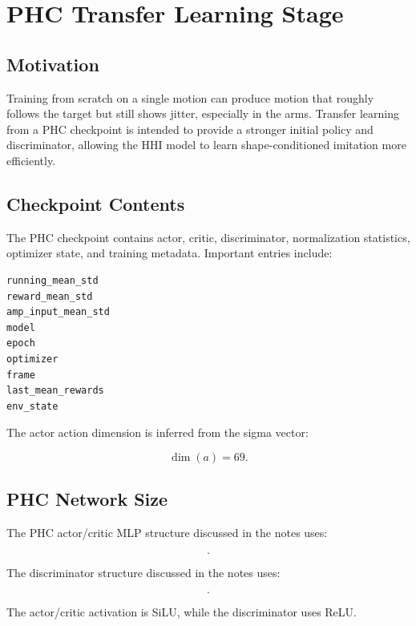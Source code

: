 \documentclass[11pt,a4paper]{article}
\begin{document}
\section{PHC Transfer Learning Stage}

\subsection{Motivation}

Training from scratch on a single motion can produce motion that roughly follows the target but still shows jitter, especially in the arms. Transfer learning from a PHC checkpoint is intended to provide a stronger initial policy and discriminator, allowing the HHI model to learn shape-conditioned imitation more efficiently.

\subsection{Checkpoint Contents}

The PHC checkpoint contains actor, critic, discriminator, normalization statistics, optimizer state, and training metadata. Important entries include:

\begin{lstlisting}
running_mean_std
reward_mean_std
amp_input_mean_std
model
epoch
optimizer
frame
last_mean_rewards
env_state
\end{lstlisting}

The actor action dimension is inferred from the sigma vector:

\begin{equation}
    \dim(a)=69.
\end{equation}

\subsection{PHC Network Size}

The PHC actor/critic MLP structure discussed in the notes uses:

\begin{equation}
    [2048, 1536, 1024, 1024, 512, 512].
\end{equation}

The discriminator structure discussed in the notes uses:

\begin{equation}
    [1024, 512].
\end{equation}

The actor/critic activation is SiLU, while the discriminator uses ReLU.
\end{document}
